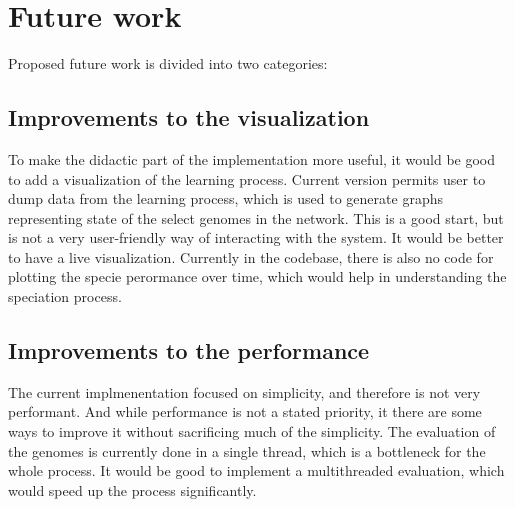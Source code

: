 \documentclass{article}
\begin{document}
\section{Future work}
    Proposed future work is divided into two categories: 
        \subsection{Improvements to the visualization} 
        To make the didactic part of the implementation more useful, it would be good to add a visualization of the
        learning process. Current version permits user to dump data from the learning process, which is used to
        generate graphs representing state of the select genomes in the network. This is a good start, but is not
        a very user-friendly way of interacting with the system. It would be better to have a live visualization.
        Currently in the codebase, there is also no code for plotting the specie perormance over time, which would
        help in understanding the speciation process.
        \subsection{Improvements to the performance}
        The current implmenentation focused on simplicity, and therefore is not very performant. And while performance
        is not a stated priority, it there are some ways to improve it without sacrificing much of the simplicity.
        The evaluation of the genomes is currently done in a single thread, which is a bottleneck for the whole process.
        It would be good to implement a multithreaded evaluation, which would speed up the process significantly.

\end{document}
